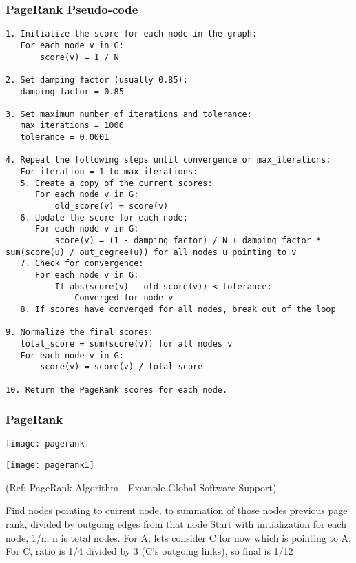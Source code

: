 \begin{frame}[fragile]\frametitle{PageRank Pseudo-code}

\begin{lstlisting}[basicstyle=\tiny]
1. Initialize the score for each node in the graph:
   For each node v in G:
       score(v) = 1 / N
	   
2. Set damping factor (usually 0.85):
   damping_factor = 0.85
   
3. Set maximum number of iterations and tolerance:
   max_iterations = 1000
   tolerance = 0.0001
   
4. Repeat the following steps until convergence or max_iterations:
   For iteration = 1 to max_iterations:
   5. Create a copy of the current scores:
      For each node v in G:
          old_score(v) = score(v)
   6. Update the score for each node:
      For each node v in G:
          score(v) = (1 - damping_factor) / N + damping_factor * sum(score(u) / out_degree(u)) for all nodes u pointing to v
   7. Check for convergence:
      For each node v in G:
          If abs(score(v) - old_score(v)) < tolerance:
              Converged for node v
   8. If scores have converged for all nodes, break out of the loop
   
9. Normalize the final scores:
   total_score = sum(score(v)) for all nodes v
   For each node v in G:
       score(v) = score(v) / total_score
	   
10. Return the PageRank scores for each node.
\end{lstlisting}

\end{frame}

\begin{frame}[fragile]\frametitle{PageRank}

\begin{center}
\texttt{[image: pagerank]}

\texttt{[image: pagerank1]}

{\tiny (Ref: PageRank Algorithm - Example Global Software Support)}
\end{center}	  

Find nodes pointing to current node, to summation of those nodes previous page rank, divided by outgoing edges from that node
Start with initialization for each node, 1/n, n is total nodes. For A, lets consider C for now which is pointing to A. For C, ratio is 1/4 divided by 3 (C's outgoing links), so final is 1/12


\end{frame}


